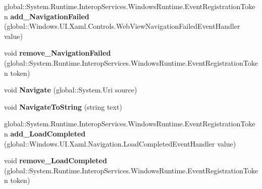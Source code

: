 \begin{DoxyCompactItemize}
\mbox{\label{interface_windows_1_1_u_i_1_1_xaml_1_1_controls_1_1_i_web_view_ac5c8918c61695196369083e55461e2ae}} 
global\+::\+System.\+Runtime.\+Interop\+Services.\+Windows\+Runtime.\+Event\+Registration\+Token {\bfseries add\+\_\+\+Navigation\+Failed} (global\+::\+Windows.\+U\+I.\+Xaml.\+Controls.\+Web\+View\+Navigation\+Failed\+Event\+Handler value)
\item 
\mbox{\label{interface_windows_1_1_u_i_1_1_xaml_1_1_controls_1_1_i_web_view_a2701e74fa38f2b8566ba2ded21b4f20f}} 
void {\bfseries remove\+\_\+\+Navigation\+Failed} (global\+::\+System.\+Runtime.\+Interop\+Services.\+Windows\+Runtime.\+Event\+Registration\+Token token)
\item 
\mbox{\label{interface_windows_1_1_u_i_1_1_xaml_1_1_controls_1_1_i_web_view_ad6b51d8da7bbcb753718bf0fbdf993e9}} 
void {\bfseries Navigate} (global\+::\+System.\+Uri source)
\item 
\mbox{\label{interface_windows_1_1_u_i_1_1_xaml_1_1_controls_1_1_i_web_view_a5d3ada22753e211f63167cbea88d12f7}} 
void {\bfseries Navigate\+To\+String} (string text)
\item 
\mbox{\label{interface_windows_1_1_u_i_1_1_xaml_1_1_controls_1_1_i_web_view_a13cd0995f18f6d179d71abd176ff1dba}} 
global\+::\+System.\+Runtime.\+Interop\+Services.\+Windows\+Runtime.\+Event\+Registration\+Token {\bfseries add\+\_\+\+Load\+Completed} (global\+::\+Windows.\+U\+I.\+Xaml.\+Navigation.\+Load\+Completed\+Event\+Handler value)
\item 
\mbox{\label{interface_windows_1_1_u_i_1_1_xaml_1_1_controls_1_1_i_web_view_af38e4aa4ca0e989fc46d0f629fd7564e}} 
void {\bfseries remove\+\_\+\+Load\+Completed} (global\+::\+System.\+Runtime.\+Interop\+Services.\+Windows\+Runtime.\+Event\+Registration\+Token token)
\item 
\mbox{\label{interface_windows_1_1_u_i_1_1_xaml_1_1_controls_1_1_i_web_view_aadb8186d118d49d86ee192f2534cac58}} 

\end{DoxyCompactItemize}
